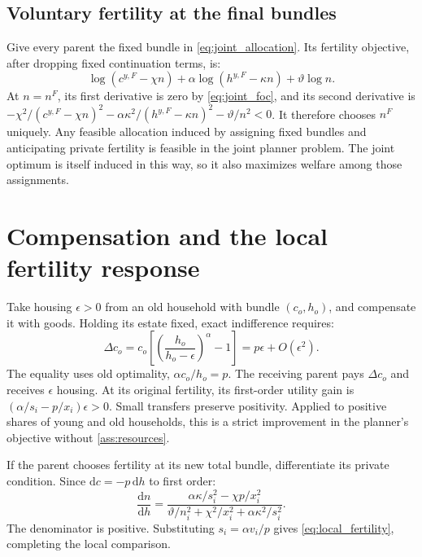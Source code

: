 \documentclass[11pt]{article}
\newcommand{\dd}{\mathrm d}
\begin{document}
\subsection{Voluntary fertility at the final bundles}

Give every parent the fixed bundle in \eqref{eq:joint_allocation}. Its
fertility objective, after dropping fixed continuation terms, is:
\begin{equation}
\log(c^{y,F}-\chi n)+\alpha\log(h^{y,F}-\kappa n)
   +\vartheta\log n.
\end{equation}
At $n=n^F$, its first derivative is zero by \eqref{eq:joint_foc}, and
its second derivative is
$-\chi^2/(c^{y,F}-\chi n)^2-\alpha\kappa^2/(h^{y,F}-\kappa n)^2
-\vartheta/n^2<0$. It therefore chooses $n^F$ uniquely. Any feasible
allocation induced by assigning fixed bundles and anticipating private
fertility is feasible in the joint planner problem. The joint optimum is
itself induced in this way, so it also maximizes welfare among those
assignments.

\section{Compensation and the local fertility response}\label{app:local}

Take housing $\epsilon>0$ from an old household with bundle $(c_o,h_o)$,
and compensate it with goods. Holding its estate fixed, exact indifference
requires:
\begin{equation}
\Delta c_o=c_o\left[\left(\frac{h_o}{h_o-\epsilon}\right)^\alpha-1\right]
 =p\epsilon+O(\epsilon^2).
\end{equation}
The equality uses old optimality, $\alpha c_o/h_o=p$. The receiving parent
pays $\Delta c_o$ and receives $\epsilon$ housing. At its original fertility,
its first-order utility gain is $(\alpha/s_i-p/x_i)\epsilon>0$.
Small transfers preserve positivity. Applied to positive shares of young and
old households, this is a strict improvement in the planner's objective
without \eqref{ass:resources}.

If the parent chooses fertility at its new total bundle, differentiate its
private condition. Since $\dd c=-p\,\dd h$ to first order:
\begin{equation}
\frac{\dd n}{\dd h}
 =\frac{\alpha\kappa/s_i^2-\chi p/x_i^2}
 {\vartheta/n_i^2+\chi^2/x_i^2+\alpha\kappa^2/s_i^2}.
\end{equation}
The denominator is positive. Substituting $s_i=\alpha v_i/p$ gives
\eqref{eq:local_fertility}, completing the local comparison.
\end{document}
